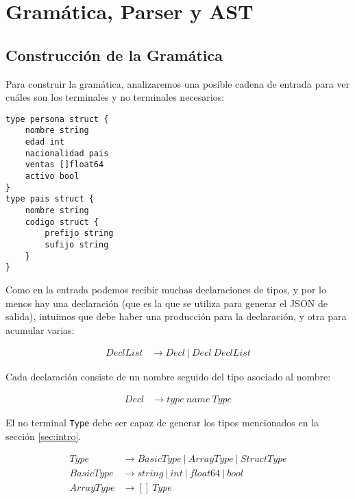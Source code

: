 \section{Gramática, Parser y AST}
\label{sec:gramatica}

\subsection{Construcción de la Gramática}

Para construir la gramática, analizaremos una posible cadena de entrada para
ver cuáles son los terminales y no terminales necesarios:

\begin{verbatim}
type persona struct {
    nombre string
    edad int
    nacionalidad pais
    ventas []float64
    activo bool
}
type pais struct {
    nombre string
    codigo struct {
        prefijo string
        sufijo string
    }
}
\end{verbatim}

Como en la entrada podemos recibir muchas declaraciones de tipos, y por lo
menos hay una declaración (que es la que se utiliza para generar el JSON de
salida), intuimos que debe haber una producción para la declaración, y otra
para acumular varias:

\begin{equation}
\begin{split}
DeclList & \rightarrow Decl~|~Decl~DeclList 
\end{split}
\end{equation}

Cada declaración consiste de un nombre seguido del tipo asociado al nombre:

\begin{equation} \label{gram:decl}
\begin{split}
Decl & \rightarrow type~name~Type
\end{split}
\end{equation}

El no terminal \texttt{Type} debe ser capaz de generar los tipos mencionados en
la sección \ref{sec:intro}. 

\begin{equation} \label{gram:type}
\begin{split}
Type & \rightarrow BasicType~|~ArrayType~|~StructType \\
BasicType & \rightarrow string~|~int~|~float64~|~bool \\
ArrayType & \rightarrow []~Type
\end{split}
\end{equation}

